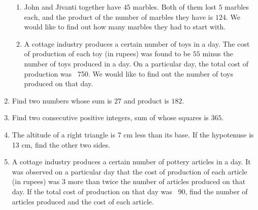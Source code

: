 \begin{enumerate}[label=\thesubsection.\arabic*,ref=\thesubsection.\theenumi]
\begin{enumerate}
\item John and Jivanti together have $45$ marbles. Both of them lost $5$ marbles each, and the product of the number of marbles they have is $124$. We would like to find out how many marbles they had to start with.
\item A cottage industry produces a certain number of toys in a day. The cost of production of each toy (in rupees) was found to be $55$ minus the number of toys produced in a day. On a particular day, the total cost of production was \rupee~750. We would like to find out the number of toys produced on that day.
\end{enumerate}
\item Find two numbers whose sum is $27$ and product is $182$.
\item Find two consecutive  positive integers, sum of whose squares is $365$.
\item  The altitude of a right triangle is 7 cm less than its base. If the hypotenuse is 13 cm, find the other two sides.
\item A cottage industry produces a certain number of pottery articles in a day. It was observed on a particular day that the cost of production of each article (in rupees) was $3$ more than twice the number of articles produced on that day. If the total cost of production on that day was \rupee~90, find the number of articles produced and the cost of each article.
\end{enumerate}
